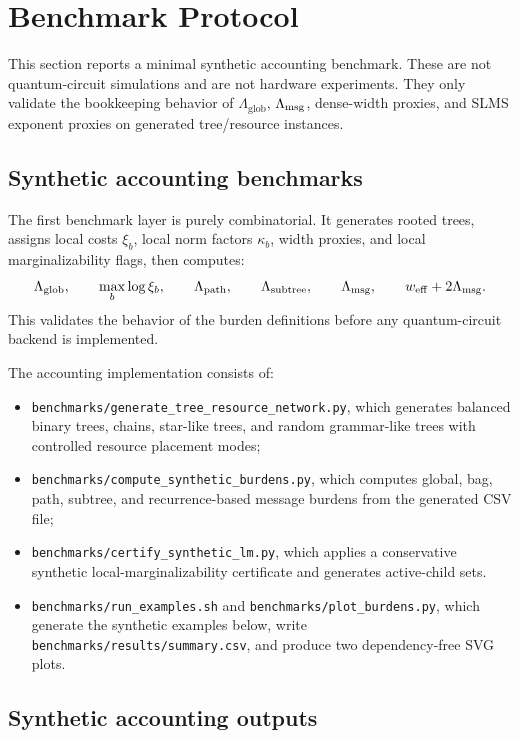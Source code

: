 \section{Benchmark Protocol}
\label{sec:benchmarks}

This section reports a minimal synthetic accounting benchmark. These are not quantum-circuit simulations and are not hardware experiments. They only validate the bookkeeping behavior of \(\Lambda_{\mathrm{glob}}\), \(\Lambda_{\mathrm{msg}}\), dense-width proxies, and SLMS exponent proxies on generated tree/resource instances.

\subsection{Synthetic accounting benchmarks}

The first benchmark layer is purely combinatorial. It generates rooted trees, assigns local costs \(\xi_b\), local norm factors \(\kappa_b\), width proxies, and local marginalizability flags, then computes:
\[
\Lambda_{\mathrm{glob}},\qquad
\max_b\log\xi_b,\qquad
\Lambda_{\mathrm{path}},\qquad
\Lambda_{\mathrm{subtree}},\qquad
\Lambda_{\mathrm{msg}},\qquad
w_{\mathrm{eff}}+2\Lambda_{\mathrm{msg}} .
\]
This validates the behavior of the burden definitions before any quantum-circuit backend is implemented.

The accounting implementation consists of:
\begin{itemize}[leftmargin=1.2cm]
\item \texttt{benchmarks/generate\_tree\_resource\_network.py}, which generates balanced binary trees, chains, star-like trees, and random grammar-like trees with controlled resource placement modes;
\item \texttt{benchmarks/compute\_synthetic\_burdens.py}, which computes global, bag, path, subtree, and recurrence-based message burdens from the generated CSV file;
\item \texttt{benchmarks/certify\_synthetic\_lm.py}, which applies a conservative synthetic local-marginalizability certificate and generates active-child sets.
\item \texttt{benchmarks/run\_examples.sh} and \texttt{benchmarks/plot\_burdens.py}, which generate the synthetic examples below, write \texttt{benchmarks/results/summary.csv}, and produce two dependency-free SVG plots.
\end{itemize}

\subsection{Synthetic accounting outputs}

